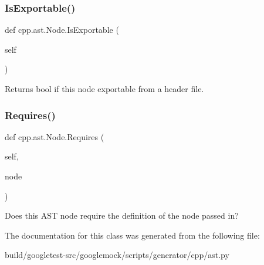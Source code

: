 \subsubsection{\texorpdfstring{Is\+Exportable()}{IsExportable()}}
{\footnotesize\ttfamily def cpp.\+ast.\+Node.\+Is\+Exportable (\begin{DoxyParamCaption}\item[{}]{self }\end{DoxyParamCaption})}

\begin{DoxyVerb}Returns bool if this node exportable from a header file.\end{DoxyVerb}
 \mbox{\label{classcpp_1_1ast_1_1Node_a31ae211f954a8c578ef16226df5ac8c8}} 
\subsubsection{\texorpdfstring{Requires()}{Requires()}}
{\footnotesize\ttfamily def cpp.\+ast.\+Node.\+Requires (\begin{DoxyParamCaption}\item[{}]{self,  }\item[{}]{node }\end{DoxyParamCaption})}

\begin{DoxyVerb}Does this AST node require the definition of the node passed in?\end{DoxyVerb}
 

The documentation for this class was generated from the following file\+:\begin{DoxyCompactItemize}
\item 
build/googletest-\/src/googlemock/scripts/generator/cpp/ast.\+py\end{DoxyCompactItemize}
